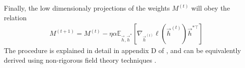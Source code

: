 Finally, the low dimensionaly projections of the weights $M^{(t)}$ will obey the relation
\begin{align} %
    M^{(t+1)} = M^{(t)} - \eta \alpha \mathbb{E}_{\vec h, \vec h^*}\left[\nabla_{\vec h^{(t)}}\ell\left( \vec h^{(t)}\right) \vec h^{*\top}\right]
\end{align}
The procedure is explained in detail in appendix D of \citep{gerbelot2022rigorous}, and can be equivalently derived using non-rigorous field theory techniques \citep{agoritsas2018out}.

